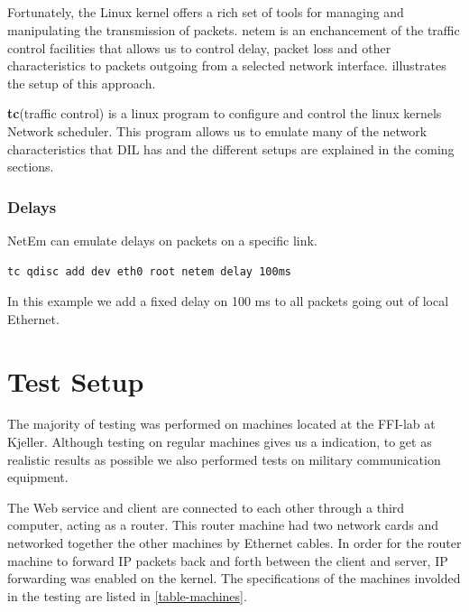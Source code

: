 \subsection{}

Fortunately, the Linux kernel offers a rich set of tools for managing and
manipulating the transmission of packets. \gls{netem} is an enchancement of the
traffic control facilities that allows us to control delay, packet loss and
other characteristics to packets outgoing from a selected network interface.
 illustrates the setup of this approach.




\textbf{tc}(traffic control) is a linux program to configure and control the
linux kernels Network scheduler. This program allows us to emulate many of the
network characteristics that DIL has and the different setups are explained in
the coming sections.

\subsubsection{Delays}

NetEm can emulate delays on packets on a specific link.

\begin{lstlisting}[frame=single, caption="Emulating delay"]
  tc qdisc add dev eth0 root netem delay 100ms
\end{lstlisting}

In this example we add a fixed delay on 100 ms to all packets going out of local
Ethernet.


\section{Test Setup}
\label{testing-environment}

The majority of testing was performed on machines located at the FFI-lab at
Kjeller. Although testing on regular machines gives us a indication, to get as
realistic results as possible we also performed tests on military communication
equipment.

The Web service and client are connected to each other through a third
computer, acting as a router. This router machine had two network cards and
networked together the other machines by Ethernet cables. In order for the
router machine to forward IP packets back and forth between the client and
server, IP forwarding was enabled on the kernel. The specifications of the
machines involded in the testing are listed in \cref{table-machines}.

